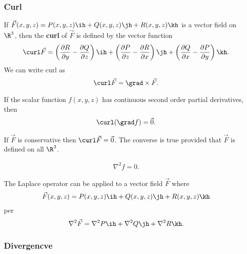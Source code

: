\documentclass{article}
\begin{document}
\subsubsection{Curl}
\begin{definition}
    If $\vec F(x,y,z) = P(x,y,z)\ih + Q(x,y,z)\jh + R(x,y,z)\kh$ is a vector field
    on $\R^3$, then the \textbf{curl} of $\vec F$ is defined by the vector function
    \begin{align*}
        \curl\vec F = \left(\frac{\partial R}{\partial y}-\frac{\partial Q}{\partial z}\right)\ih
        +\left(\frac{\partial P}{\partial z}-\frac{\partial R}{\partial x}\right)\jh
        +\left(\frac{\partial Q}{\partial x}-\frac{\partial P}{\partial y}\right)\kh.
    \end{align*}
    We can write curl as
    \begin{align*}
        \curl\vec F = \grad \times \vec F.
    \end{align*}
\end{definition}
\begin{theorem}
    If the scalar function $f(x,y,z)$ has continuous second order partial derivatives,
    then
    \begin{align*}
        \curl(\grad f) = \vec 0.
    \end{align*}
\end{theorem}
\begin{corollary}
    If $\vec F$ is conservative then $\curl\vec F = \vec 0$. The converse is true
    provided that $\vec F$ is defined on all $\R^3$.
\end{corollary}
\begin{theorem}
    \begin{align*}
        \nabla^2 f = 0.
    \end{align*}
\end{theorem}
\begin{definition}
    The Laplace operator can be applied to a vector field $\vec F$ where
    \begin{align*}
        \vec F(x,y,z) =P(x,y,z)\ih + Q(x,y,z)\jh + R(x,y,z)\kh
    \end{align*}
    per
    \begin{align*}
        \nabla^2 \vec F = \nabla^2 P\ih + \nabla^2 Q\jh + \nabla^2 R\kh.
    \end{align*}
\end{definition}

\subsubsection{Divergencve}
\end{document}
